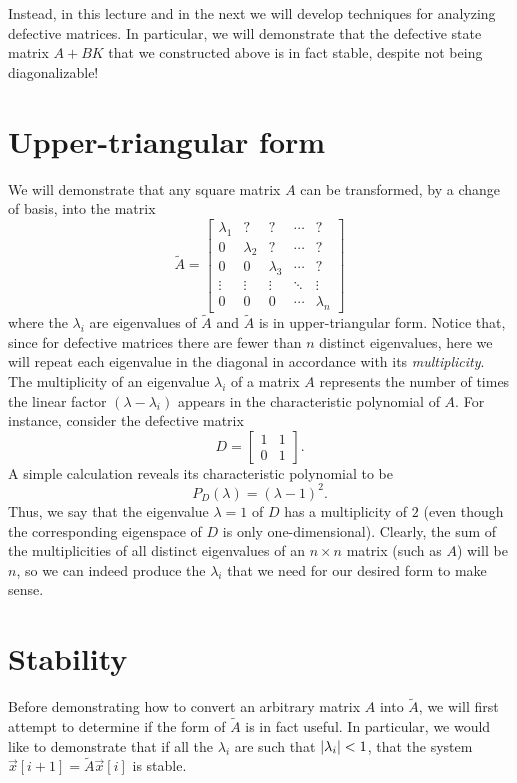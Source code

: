\documentclass[letterpaper]{article}
\theoremstyle{remark}
\renewcommand{\tilde}[1]{\widetilde{#1}}
\newcommand{\mat}[1]{\ensuremath{\begin{bmatrix}#1\end{bmatrix}}}
\begin{document}
Instead, in this lecture and in the next we will develop techniques for analyzing defective matrices. In particular, we will demonstrate that the defective state matrix $A + BK$ that we constructed above is in fact stable, despite not being diagonalizable!

\section{Upper-triangular form}
We will demonstrate that any square matrix $A$ can be transformed, by a change of basis, into the matrix
\[
    \tilde{A} = \mat{
    \lambda_1 & ? & ? & \cdots & ? \\ 
    0 & \lambda_2 & ? & \cdots & ? \\
    0 & 0 & \lambda_3 & \cdots & ? \\
    \vdots & \vdots & \vdots & \ddots & \vdots \\
    0 & 0 & 0 & \cdots & \lambda_n}
\]
where the $\lambda_i$ are eigenvalues of $\tilde{A}$ and $\tilde{A}$ is in upper-triangular form. Notice that, since for defective matrices there are fewer than $n$ distinct eigenvalues, here we will repeat each eigenvalue in the diagonal in accordance with its \emph{multiplicity}. The multiplicity of an eigenvalue $\lambda_i$ of a matrix $A$ represents the number of times the linear factor $(\lambda - \lambda_i)$ appears in the characteristic polynomial of $A$. For instance, consider the defective matrix
\[
    D = \mat{1 & 1 \\ 0 & 1}.
\]
A simple calculation reveals its characteristic polynomial to be
\[
    P_D(\lambda) = (\lambda - 1)^2.
\]
Thus, we say that the eigenvalue $\lambda = 1$ of $D$ has a multiplicity of $2$ (even though the corresponding eigenspace of $D$ is only one-dimensional). Clearly, the sum of the multiplicities of all distinct eigenvalues of an $n\times n$ matrix (such as $A$) will be $n$, so we can indeed produce the $\lambda_i$ that we need for our desired form to make sense.

\section{Stability}
Before demonstrating how to convert an arbitrary matrix $A$ into $\tilde{A}$, we will first attempt to determine if the form of $\tilde{A}$ is in fact useful. In particular, we would like to demonstrate that if all the $\lambda_i$ are such that $\abs{\lambda_i} < 1$, that the system $\vec{x}[i + 1] = \tilde{A}\vec{x}[i]$ is stable.
\end{document}

